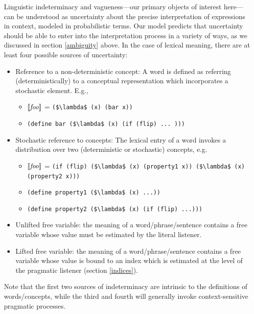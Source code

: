 \documentclass[pdfextras]{handbook}
\newcommand{\llbracket}{\ensuremath{\left [\!\left [}}%
\newcommand{\rrbracket}{\ensuremath{\right ]\!\right ]}}
\providecommand{\sv}[1]{\ensuremath{\llbracket \mathit{#1} \rrbracket}}
\begin{document}
Linguistic indeterminacy and vagueness---our primary objects of interest here---can be understood as uncertainty about the precise interpretation of expressions in context, modeled in probabilistic terms. 
Our model predicts that uncertainty should be able to enter into the interpretation process in a variety of ways, as we discussed in section \ref{ambiguity} above. 
In the case of lexical meaning, there are at least four possible sources of uncertainty:
\begin{itemize}
\item Reference to a non-deterministic concept: A word is defined as referring (deterministically) to a conceptual representation which incorporates a stochastic element. E.g., 
\begin{itemize}
\item \sv{foo} = \lstinline[mathescape]{($\lambda$ (x) (bar x))}
\item \lstinline[mathescape]{(define bar ($\lambda$ (x) (if (flip) ... )))}
\end{itemize}
\item Stochastic reference to concepts: The lexical entry of a word invokes a distribution over two (deterministic or stochastic) concepts, e.g.  
\begin{itemize}
\item \sv{foo} = \lstinline[mathescape]{(if (flip) ($\lambda$ (x) (property1 x)) ($\lambda$ (x) (property2 x)))}
\item \lstinline[mathescape]{(define property1 ($\lambda$ (x) ...))}
\item \lstinline[mathescape]{(define property2 ($\lambda$ (x) (if (flip) ...)))}
\end{itemize}
\item Unlifted free variable: the meaning of a word/phrase/sentence contains a free variable whose value must be estimated by the literal listener. 
\item Lifted free variable: the meaning of a word/phrase/sentence contains a free variable whose value is bound to an index which is estimated at the level of the pragmatic listener (section \ref{indices}). 
\end{itemize}
Note that the first two sources of indeterminacy are intrinsic to the definitions of words/concepts, while the third and fourth will generally invoke context-sensitive pragmatic processes. 
\end{document}
